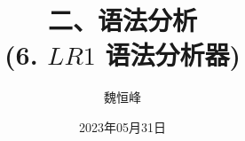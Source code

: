 \documentclass[]{beamer}
\title[语法分析]{二、语法分析 \\ (6. $LR1$ 语法分析器)}
\author[魏恒峰]{\large 魏恒峰}
\institute{hfwei@nju.edu.cn}
\date{2023年05月31日}
\begin{document}
\maketitle



\thankyou{}

\end{document}
